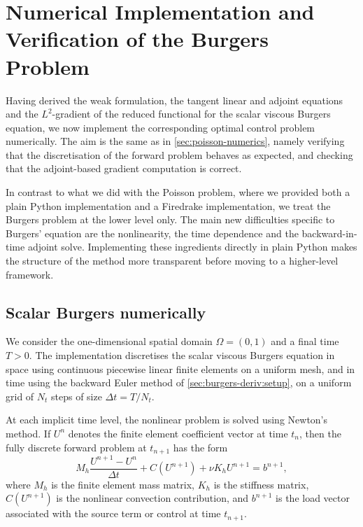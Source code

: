 \documentclass[a4paper,11pt]{article}
\newcommand{\Om}{\Omega}
\theoremstyle{spacedplain} \newtheorem{theorem}[counter]{Theorem} \newtheorem{lemma}[counter]{Lemma} \newtheorem{prop}[counter]{Proposition} \newtheorem{cor}[counter]{Corollary}
\theoremstyle{spaceddefinition} \newtheorem{defn}[counter]{Definition} \newtheorem{example}[counter]{Example} \newtheorem{remark}[counter]{Remark}
\begin{document}
\section{Numerical Implementation and Verification of the Burgers Problem}
\label{sec:burgers-numerics}

Having derived the weak formulation, the tangent linear and adjoint equations and the $L^2$-gradient of the reduced functional for the scalar viscous Burgers equation, we now implement the corresponding optimal control problem numerically. The aim is the same as in \cref{sec:poisson-numerics}, namely verifying that the discretisation of the forward problem behaves as expected, and checking that the adjoint-based gradient computation is correct.

In contrast to what we did with the Poisson problem, where we provided both a plain Python implementation and a Firedrake implementation, we treat the Burgers problem at the lower level only. The main new difficulties specific to Burgers' equation are the nonlinearity, the time dependence and the backward-in-time adjoint solve. Implementing these ingredients directly in plain Python makes the structure of the method more transparent before moving to a higher-level framework.

\subsection{Scalar Burgers numerically}
\label{sec:burgers-numerics:byhand}

We consider the one-dimensional spatial domain $\Om = (0, 1)$ and a final time $T > 0$. The implementation discretises the scalar viscous Burgers equation in space using continuous piecewise linear finite elements on a uniform mesh, and in time using the backward Euler method of \cref{sec:burgers-deriv:setup}, on a uniform grid of $N_t$ steps of size $\Delta t = T / N_t$.

At each implicit time level, the nonlinear problem is solved using Newton's method. If $U^n$ denotes the finite element coefficient vector at time $t_n$, then the fully discrete forward problem at $t_{n+1}$ has the form
\begin{equation}
  M_h \frac{U^{n+1} - U^{n}}{\Delta t}
  + C(U^{n+1}) + \nu K_h U^{n+1} = b^{n+1},
\end{equation}
where $M_h$ is the finite element mass matrix, $K_h$ is the stiffness matrix, $C(U^{n+1})$ is the nonlinear convection contribution, and $b^{n+1}$ is the load vector associated with the source term or control at time $t_{n+1}$.
\end{document}
